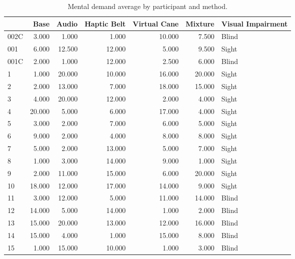 
\begin{table}[!htb]
\centering
\caption{Mental demand average by participant and method.}
\label{tab:md_average}
\begin{tabular}{lrrrrrl}
\toprule
{} &   Base &  Audio &  Haptic Belt &  Virtual Cane &  Mixture & Visual Impairment \\
\midrule
002C &  3.000 &  1.000 &        1.000 &        10.000 &    7.500 &             Blind \\
001  &  6.000 & 12.500 &       12.000 &         5.000 &    9.500 &             Sight \\
001C &  2.000 &  1.000 &       12.000 &         2.500 &    6.000 &             Blind \\
1    &  1.000 & 20.000 &       10.000 &        16.000 &   20.000 &             Sight \\
2    &  2.000 & 13.000 &        7.000 &        18.000 &   15.000 &             Sight \\
3    &  4.000 & 20.000 &       12.000 &         2.000 &    4.000 &             Sight \\
4    & 20.000 &  5.000 &        6.000 &        17.000 &    4.000 &             Sight \\
5    &  3.000 &  2.000 &        7.000 &         6.000 &    5.000 &             Sight \\
6    &  9.000 &  2.000 &        4.000 &         8.000 &    8.000 &             Sight \\
7    &  5.000 &  2.000 &       13.000 &         5.000 &    7.000 &             Sight \\
8    &  1.000 &  3.000 &       14.000 &         9.000 &    1.000 &             Sight \\
9    &  2.000 & 11.000 &       15.000 &         6.000 &   20.000 &             Sight \\
10   & 18.000 & 12.000 &       17.000 &        14.000 &    9.000 &             Sight \\
11   &  3.000 & 12.000 &        5.000 &        11.000 &   14.000 &             Blind \\
12   & 14.000 &  5.000 &       14.000 &         1.000 &    2.000 &             Blind \\
13   & 15.000 & 20.000 &       13.000 &        12.000 &   16.000 &             Blind \\
14   & 15.000 &  4.000 &        1.000 &        15.000 &    8.000 &             Blind \\
15   &  1.000 & 15.000 &       10.000 &         1.000 &    3.000 &             Blind \\

\end{tabular}
\end{table}
